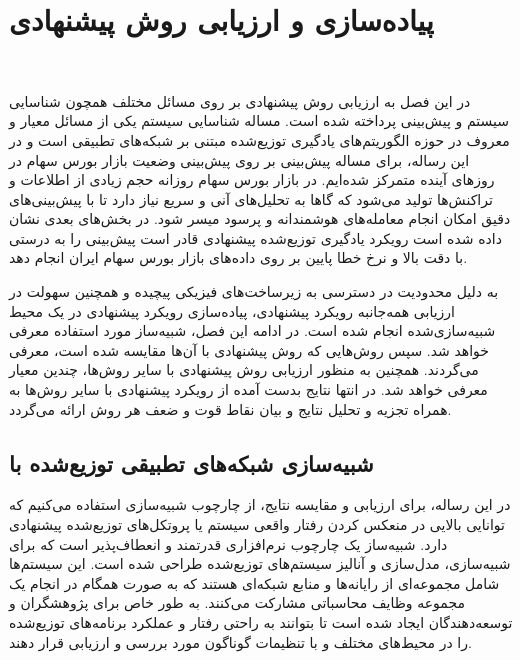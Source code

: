 \chapter{پیاده‌سازی و ارزیابی روش پیشنهادی}
\newpage
‎\renewcommand{\baselinestretch}{2}\normalsize‎
\label{ExperimentResults}

در این فصل به ارزیابی روش پیشنهادی بر روی مسائل مختلف همچون   شناسایی سیستم و پیش‌بینی پرداخته شده است. مساله شناسایی سیستم یکی از مسائل معیار و معروف در حوزه الگوریتم‌های یادگیری توزیع‌شده مبتنی بر شبکه‌های تطبیقی است و در این رساله، برای مساله پیش‌بینی بر روی پیش‌بینی وضعیت بازار بورس سهام در روزهای آینده متمرکز شده‌ایم. در بازار بورس سهام روزانه حجم زیادی از اطلاعات و تراکنش‌ها تولید می‌شود که گاها به تحلیل‌های آنی و سریع نیاز دارد تا‌‌ با پیش‌بینی‌های دقیق امکان انجام معامله‌های هوشمندانه و پرسود میسر شود. در بخش‌های بعدی نشان داده شده است رویکرد یادگیری توزیع‌شده پیشنهادی قادر است پیش‌بینی را به درستی با دقت بالا و نرخ خطا پایین بر روی داده‌های بازار بورس سهام ایران انجام دهد.

به دلیل محدودیت‌ در دسترسی به زیرساخت‌های فیزیکی پیچیده و همچنین سهولت در ارزیابی همه‌جانبه رویکرد پیشنهادی، پیاده‌سازی رویکرد پیشنهادی در یک محیط شبیه‌سازی‌شده انجام شده است. در ادامه این فصل، شبیه‌ساز مورد استفاده معرفی خواهد شد. سپس روش‌هایی که روش پیشنهادی با آن‌ها مقایسه شده است، معرفی می‌گردند. همچنین به منظور ارزیابی روش پیشنهادی با سایر روش‌ها، چندین معیار معرفی خواهد شد. در انتها نتایج بدست آمده از رویکرد پیشنهادی با سایر روش‌‌ها به همراه تجزیه و تحلیل نتایج و بیان نقاط قوت و ضعف هر روش ارائه می‌گردد. 

\section{شبیه‌سازی شبکه‌های تطبیقی توزیع‌شده با }\label{SimGrid}

در این رساله، برای ارزیابی و مقایسه نتایج، از چارچوب شبیه‌سازی  \cite{SimGrid2014} استفاده می‌کنیم که توانایی بالایی در منعکس کردن رفتار واقعی سیستم یا پروتکل‌های توزیع‌شده پیشنهادی دارد. شبیه‌ساز  یک چارچوب نرم‌افزاری قدرتمند و انعطاف‌پذیر است که برای شبیه‌سازی، مدل‌سازی و آنالیز سیستم‌های توزیع‌شده طراحی شده است. این سیستم‌ها شامل مجموعه‌ای از رایانه‌ها و منابع شبکه‌ای هستند که به صورت همگام در انجام یک مجموعه وظایف محاسباتی مشارکت می‌کنند.  به طور خاص برای پژوهشگران و توسعه‌دهندگان ایجاد شده است تا بتوانند به راحتی رفتار و عملکرد برنامه‌های توزیع‌شده را در محیط‌های مختلف و با تنظیمات گوناگون مورد بررسی و ارزیابی قرار دهند.

